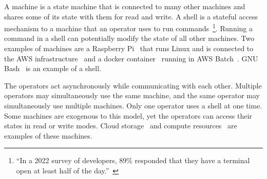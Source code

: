A machine is a state machine that is connected to many other machines and shares some of its state with them for read and write. A shell is a stateful access mechanism to a machine that an operator uses to run commands~\footnote{\enquote{In a 2022 survey of developers, 89\% responded that they have a terminal open at least half of the day.}~\cite{textualize_founded}}. Running a command in a shell can potentially modify the state of all other machines. Two examples of machines are a Raspberry Pi~\cite{rpi} that runs Linux and is connected to the AWS infrastructure~\cite{aws} and a docker container~\cite{docker} running in AWS Batch~\cite{aws_batch}. GNU Bash~\cite{gnu_bash} is an example of a shell.

The operators act asynchronously while communicating with each other. Multiple operators may simultaneously use the same machine, and the same operator may simultaneously use multiple machines. Only one operator uses a shell at one time. Some machines are exogenous to this model, yet the operators can access their states in read or write modes. Cloud storage~\cite{aws_s3} and compute resources~\cite{aws_batch} are examples of these machines.